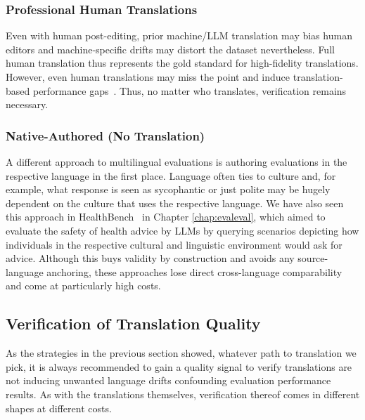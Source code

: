 \subsubsection{Professional Human Translations}
Even with human post-editing, prior machine/LLM translation may bias human editors and machine-specific drifts may distort the dataset nevertheless. Full human translation thus represents the gold standard for high-fidelity translations. However, even human translations may miss the point and induce translation-based performance gaps~\cite{peter2025mind-728}. Thus, no matter who translates, verification remains necessary. 

\subsubsection{Native-Authored (No Translation)}
A different approach to multilingual evaluations is authoring evaluations in the respective language in the first place. Language often ties to culture and, for example, what response is seen as sycophantic or just polite may be hugely dependent on the culture that uses the respective language. We have also seen this approach in HealthBench~\cite{arora2025healthbench-7eb} in Chapter \ref{chap:evaleval}, which aimed to evaluate the safety of health advice by LLMs by querying scenarios depicting how individuals in the respective cultural and linguistic environment would ask for advice. Although this buys validity by construction and avoids any source-language anchoring, these approaches lose direct cross-language comparability and come at particularly high costs. 

\subsection{Verification of Translation Quality}
As the strategies in the previous section showed, whatever path to translation we pick, it is always recommended to gain a quality signal to verify translations are not inducing unwanted language drifts confounding evaluation performance results. As with the translations themselves, verification thereof comes in different shapes at different costs.

